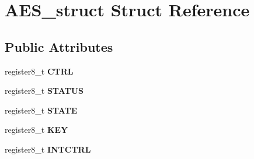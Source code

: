 \hypertarget{struct_a_e_s__struct}{}\section{A\+E\+S\+\_\+struct Struct Reference}
\label{struct_a_e_s__struct}
\subsection*{Public Attributes}
\begin{DoxyCompactItemize}
\item 
register8\+\_\+t {\bfseries C\+T\+RL}\hypertarget{struct_a_e_s__struct_a3606c693d6d94220357ea8704772d5b2}{}\label{struct_a_e_s__struct_a3606c693d6d94220357ea8704772d5b2}

\item 
register8\+\_\+t {\bfseries S\+T\+A\+T\+US}\hypertarget{struct_a_e_s__struct_adfcb8ebd854503b6e29f61012b8b30a4}{}\label{struct_a_e_s__struct_adfcb8ebd854503b6e29f61012b8b30a4}

\item 
register8\+\_\+t {\bfseries S\+T\+A\+TE}\hypertarget{struct_a_e_s__struct_aa8e6c65f1089a1b1f78ca8ae38f0d006}{}\label{struct_a_e_s__struct_aa8e6c65f1089a1b1f78ca8ae38f0d006}

\item 
register8\+\_\+t {\bfseries K\+EY}\hypertarget{struct_a_e_s__struct_a46d2e76116d9e16fc3c4f1da1f16872d}{}\label{struct_a_e_s__struct_a46d2e76116d9e16fc3c4f1da1f16872d}

\item 
register8\+\_\+t {\bfseries I\+N\+T\+C\+T\+RL}\hypertarget{struct_a_e_s__struct_a6fbc11bf47bb845be97ddb78f5922cac}{}\label{struct_a_e_s__struct_a6fbc11bf47bb845be97ddb78f5922cac}

\end{DoxyCompactItemize}


